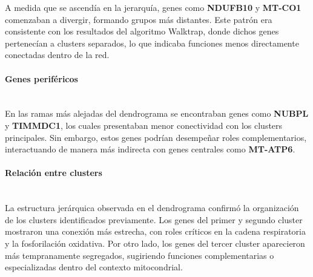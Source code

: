 A medida que se ascendía en la jerarquía, genes como \textbf{NDUFB10} y \textbf{MT-CO1} comenzaban a divergir, formando grupos más distantes. Este patrón era consistente con los resultados del algoritmo Walktrap, donde dichos genes pertenecían a clusters separados, lo que indicaba funciones menos directamente conectadas dentro de la red.

\paragraph{Genes periféricos} \mbox{}\\

En las ramas más alejadas del dendrograma se encontraban genes como \textbf{NUBPL} y \textbf{TIMMDC1}, los cuales presentaban menor conectividad con los clusters principales. Sin embargo, estos genes podrían desempeñar roles complementarios, interactuando de manera más indirecta con genes centrales como \textbf{MT-ATP6}.

\paragraph{Relación entre clusters} \mbox{}\\

La estructura jerárquica observada en el dendrograma confirmó la organización de los clusters identificados previamente. Los genes del primer y segundo cluster mostraron una conexión más estrecha, con roles críticos en la cadena respiratoria y la fosforilación oxidativa. Por otro lado, los genes del tercer cluster aparecieron más tempranamente segregados, sugiriendo funciones complementarias o especializadas dentro del contexto mitocondrial.
